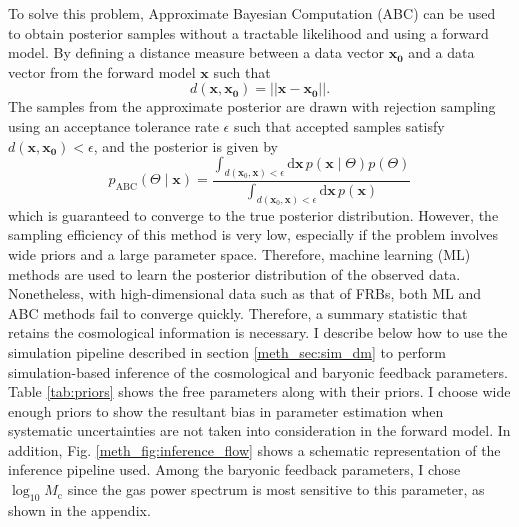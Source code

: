 To solve this problem, Approximate Bayesian Computation (ABC) can be used to obtain posterior samples without a tractable likelihood and using a forward model. By defining a distance measure between a data vector $\mathbf{x_0}$ and a data vector from the forward model $\mathbf{x}$ such that
\begin{equation}
    d(\mathbf{x}, \mathbf{x_0}) = ||\mathbf{x} - \mathbf{x_0}||.
\end{equation}
The samples from the approximate posterior are drawn with rejection sampling using an acceptance tolerance rate $\epsilon$ such that accepted samples satisfy $d(\mathbf{x}, \mathbf{x_0}) < \epsilon$, and the posterior is given by
\begin{equation}
    p_{\mathrm{ABC}}(\Theta \mid \boldsymbol{x}) = \frac{\int_{d(\boldsymbol{x}_0, \boldsymbol{x}) < \epsilon} \mathrm{d}\boldsymbol{x} \, p(\boldsymbol{x} \mid \Theta) p(\Theta)}{\int_{d(\boldsymbol{x}_0, \boldsymbol{x}) < \epsilon} \mathrm{d}\boldsymbol{x} \, p(\boldsymbol{x})}
\end{equation}
which is guaranteed to converge to the true posterior distribution. However, the sampling efficiency of this method is very low, especially if the problem involves wide priors and a large parameter space. Therefore, machine learning (ML) methods are used to learn the posterior distribution of the observed data. Nonetheless, with high-dimensional data such as that of FRBs, both ML and ABC methods fail to converge quickly. Therefore, a summary statistic that retains the cosmological information is necessary. I describe below how to use the simulation pipeline described in section \ref{meth_sec:sim_dm} to perform simulation-based inference of the cosmological and baryonic feedback parameters. Table \ref{tab:priors} shows the free parameters along with their priors. I choose wide enough priors to show the resultant bias in parameter estimation when systematic uncertainties are not taken into consideration in the forward model. In addition, Fig. \ref{meth_fig:inference_flow} shows a schematic representation of the inference pipeline used. Among the baryonic feedback parameters, I chose $\log_{10} M_\mathrm{c}$ since the gas power spectrum is most sensitive to this parameter, as shown in the appendix.

